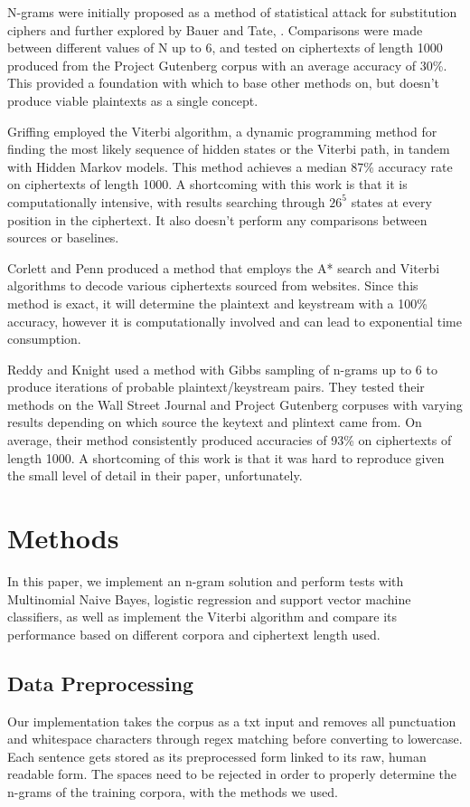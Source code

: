 \documentclass[11pt,letterpaper]{article}
\begin{document}
N-grams were initially proposed as a method of statistical attack for substitution ciphers and further explored by Bauer and Tate, \cite{Bauer:02}. Comparisons were made between different values of N up to 6, and tested on ciphertexts of length 1000 produced from the Project Gutenberg corpus with an average accuracy of 30\%. This provided a foundation with which to base other methods on, but doesn't produce viable plaintexts as a single concept.

Griffing \cite{Griffing:06} employed the Viterbi algorithm, a dynamic programming method for finding the most likely sequence of hidden states or the Viterbi path, in tandem with Hidden Markov models. This method achieves a median 87\% accuracy rate on ciphertexts of length 1000. A shortcoming with this work is that it is computationally intensive, with results searching through $26^5$ states at every position in the ciphertext. It also doesn't perform any comparisons between sources or baselines.

Corlett and Penn \cite{Corlett:10} produced a method that employs the A* search and Viterbi algorithms to decode various ciphertexts sourced from websites. Since this method is exact, it will determine the plaintext and keystream with a 100\% accuracy, however it is computationally involved and can lead to exponential time consumption.

Reddy and Knight \cite{Reddy:12} used a method with Gibbs sampling of n-grams up to 6 to produce iterations of probable plaintext/keystream pairs. They tested their methods on the Wall Street Journal and Project Gutenberg corpuses with varying results depending on which source the keytext and plintext came from. On average, their method consistently produced accuracies of 93\% on ciphertexts of length 1000. A shortcoming of this work is that it was hard to reproduce given the small level of detail in their paper, unfortunately. 

\section{Methods}
In this paper, we implement an n-gram solution and perform tests with Multinomial Naive Bayes, logistic regression and support vector machine classifiers, as well as implement the Viterbi algorithm and compare its performance based on different corpora and ciphertext length used. 

\subsection{Data Preprocessing}
Our implementation takes the corpus as a txt input and removes all punctuation and whitespace characters through regex matching before converting to lowercase. Each sentence gets stored as its preprocessed form linked to its raw, human readable form. The spaces need to be rejected in order to properly determine the n-grams of the training corpora, with the methods we used.
\end{document}
